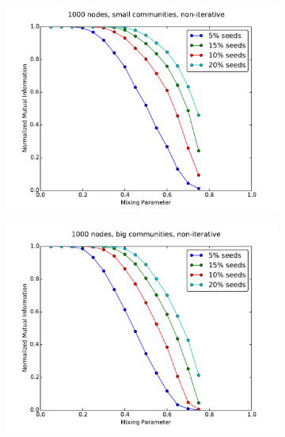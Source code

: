 \newpage

\begin{figure}
    \centering
    \begin{subfigure}{0.5\textwidth}
    \includegraphics[width=\linewidth]{allplots/nonoverlap_noniter_a.pdf}
    \end{subfigure}%
    \begin{subfigure}{0.5\textwidth}
    \includegraphics[width=\linewidth]{allplots/nonoverlap_noniter_b.pdf}
    \end{subfigure}
    \begin{subfigure}{0.5\textwidth}

\end{subfigure}
\end{figure}
